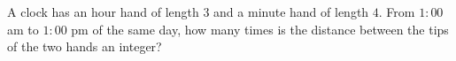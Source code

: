 A clock has an hour hand of length $3$ and a minute hand of length $4$. From $1{:}00$ am to $1{:}00$ pm of the same day, how many times is the distance between the tips of the two hands an integer?
